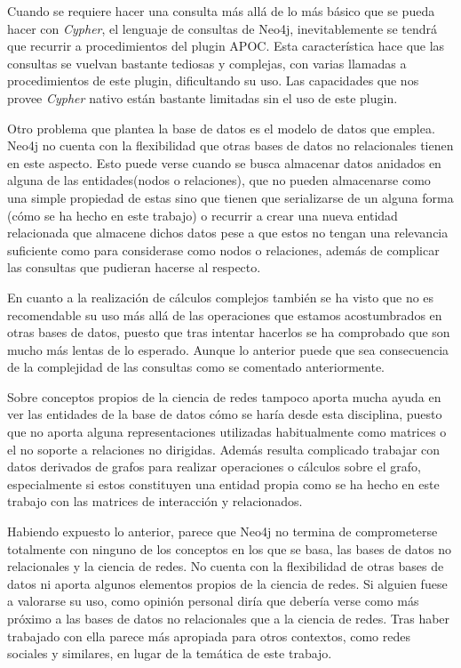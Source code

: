 Cuando se requiere hacer una consulta más allá de lo más básico que se pueda hacer con \textit{Cypher}, el lenguaje de consultas de Neo4j, inevitablemente se tendrá que recurrir a procedimientos del plugin APOC. Esta característica hace que las consultas se vuelvan bastante tediosas y complejas, con varias llamadas a procedimientos de este plugin, dificultando su uso. Las capacidades que nos provee \textit{Cypher} nativo están bastante limitadas sin el uso de este plugin.

Otro problema que plantea la base de datos es el modelo de datos que emplea. Neo4j no cuenta con la flexibilidad que otras bases de datos no relacionales tienen en este aspecto. Esto puede verse cuando se busca almacenar datos anidados en alguna de las entidades(nodos o relaciones), que no pueden almacenarse como una simple propiedad de estas sino que tienen que serializarse de un alguna forma (cómo se ha hecho en este trabajo) o recurrir a crear una nueva entidad relacionada que almacene dichos datos pese a que estos no tengan una relevancia suficiente como para considerase como nodos o relaciones, además de complicar las consultas que pudieran hacerse al respecto.

En cuanto a la realización de cálculos complejos también se ha visto que no es recomendable su uso más allá de las operaciones que estamos acostumbrados en otras bases de datos, puesto que tras intentar hacerlos se ha comprobado que son mucho más lentas de lo esperado. Aunque lo anterior puede que sea consecuencia de la complejidad de las consultas como se comentado anteriormente.

Sobre conceptos propios de la ciencia de redes tampoco aporta mucha ayuda en ver las entidades de la base de datos cómo se haría desde esta disciplina, puesto que no aporta alguna representaciones utilizadas habitualmente como matrices o el no soporte a relaciones no dirigidas. Además resulta complicado trabajar con datos derivados de grafos para realizar operaciones o cálculos sobre el grafo, especialmente si estos constituyen una entidad propia como se ha hecho en este trabajo con las matrices de interacción y relacionados.

Habiendo expuesto lo anterior, parece que Neo4j no termina de comprometerse totalmente con ninguno de los conceptos en los que se basa, las bases de datos no relacionales y la ciencia de redes. No cuenta con la flexibilidad de otras bases de datos ni aporta algunos elementos propios de la ciencia de redes. Si alguien fuese a valorarse su uso, como opinión personal diría que debería verse como más próximo a las bases de datos no relacionales que a la ciencia de redes. Tras haber trabajado con ella parece más apropiada para otros contextos, como redes sociales y similares, en lugar de la temática de este trabajo.

